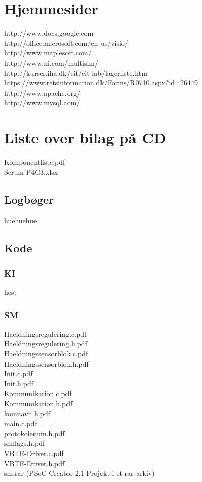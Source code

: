 \section{Hjemmesider}
http://www.docs.google.com\\
http://office.microsoft.com/en-us/visio/\\
http://www.maplesoft.com/\\
http://www.ni.com/multisim/\\
http://kurser.iha.dk/eit/eit-lab/lagerliste.htm\\
https://www.retsinformation.dk/Forms/R0710.aspx?id=26449\\
http://www.apache.org/\\
http://www.mysql.com/\\

\section{Liste over bilag på CD}
Komponentliste.pdf\\
Scrum P4G3.xlsx\\
\subsection{Logbøger}
huehuehue
\subsection{Kode}
\subsubsection{KI}
hest
\subsubsection{SM}
Haeldningsregulering.c.pdf\\
Haeldningsregulering.h.pdf\\
Haeldningssensorblok.c.pdf\\
Haeldningssensorblok.h.pdf\\
Init.c.pdf\\
Init.h.pdf\\
Kommunikation.c.pdf\\
Kommunikation.h.pdf\\
komnavn.h.pdf\\
main.c.pdf\\
protokolenum.h.pdf\\
smflags.h.pdf\\
VBTE-Driver.c.pdf\\
VBTE-Driver.h.pdf\\
sm.rar (PSoC Creator 2.1 Projekt i et rar arkiv)\\
